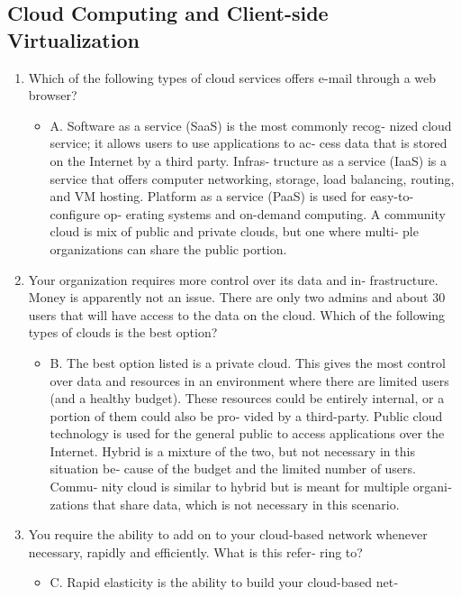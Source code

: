 \documentclass{article}
\begin{document}
\subsection{Cloud Computing and
Client-side Virtualization}
\begin{enumerate}
    \item Which of the following types of cloud services offers e-mail
through a web browser?
    \begin{itemize}
        \item A. Software as a service (SaaS) is the most commonly recog‐
nized cloud service; it allows users to use applications to ac‐
cess data that is stored on the Internet by a third party. Infras‐
tructure as a service (IaaS) is a service that offers computer
networking, storage, load balancing, routing, and VM hosting.
Platform as a service (PaaS) is used for easy-to-configure op‐
erating systems and on-demand computing. A community
cloud is mix of public and private clouds, but one where multi‐
ple organizations can share the public portion.
    \end{itemize}
    \item Your organization requires more control over its data and in‐
frastructure. Money is apparently not an issue. There are only
two admins and about 30 users that will have access to the data
on the cloud. Which of the following types of clouds is the best
option?
    \begin{itemize}
        \item B. The best option listed is a private cloud. This gives the most
control over data and resources in an environment where there
are limited users (and a healthy budget). These resources could
be entirely internal, or a portion of them could also be pro‐
vided by a third-party. Public cloud technology is used for the
general public to access applications over the Internet. Hybrid
is a mixture of the two, but not necessary in this situation be‐
cause of the budget and the limited number of users. Commu‐
nity cloud is similar to hybrid but is meant for multiple organi‐
zations that share data, which is not necessary in this scenario.
    \end{itemize}
    \item You require the ability to add on to your cloud-based network
whenever necessary, rapidly and efficiently. What is this refer‐
ring to?
    \begin{itemize}
        \item C. Rapid elasticity is the ability to build your cloud-based net‐

\end{itemize}
\end{enumerate}
\end{document}
